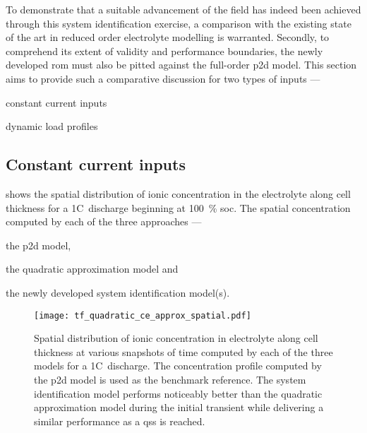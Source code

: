 
To demonstrate that a suitable advancement of the field has indeed been achieved
through  this system  identification exercise,  a comparison  with the  existing
state of the art in reduced  order electrolyte modelling is warranted. Secondly,
to  comprehend its  extent of  validity  and performance  boundaries, the  newly
developed \gls{rom} must also be  pitted against the full-order \gls{p2d} model.
This section  aims to  provide such  a comparative discussion  for two  types of
inputs ---
\begin{enumerate*}[label=\itshape\alph*\upshape)]
    \item constant current inputs
    \item dynamic load profiles
\end{enumerate*}

\subsection{Constant current inputs}\label{subsec:tfquadceconstcurrinput}

 shows  the spatial distribution  of ionic
concentration  in  the electrolyte  along  cell  thickness  for a  1C~discharge
beginning at \SI{100}{\percent} \gls{soc}. The spatial concentration computed by
each of the three approaches ---
\begin{enumerate*}[label=\roman*)]
    \item the \gls{p2d} model,
    \item the quadratic approximation model and
    \item the newly developed system identification model(s).
\end{enumerate*}

\begin{figure}[!htbp]
    \centering
    \texttt{[image: tf\_quadratic\_ce\_approx\_spatial.pdf]}
    \caption[Spatial distribution of ionic concentration in
    electrolyte for a 1C~discharge computed by the , quadratic
    approximation \& system identification models]{%
        Spatial distribution of ionic concentration  in electrolyte along cell
        thickness at various  snapshots of  time computed  by each of  the three
        models for  a 1C~discharge.  The concentration  profile  computed by
        the  \gls{p2d} model is used as the benchmark reference. The  system
        identification model performs noticeably better than the quadratic
        approximation model during  the initial  transient  while delivering a
        similar performance as a \gls{qss} is reached.
}%
\label{fig:tfquadp2dspatialionicconc1C}
\end{figure}

